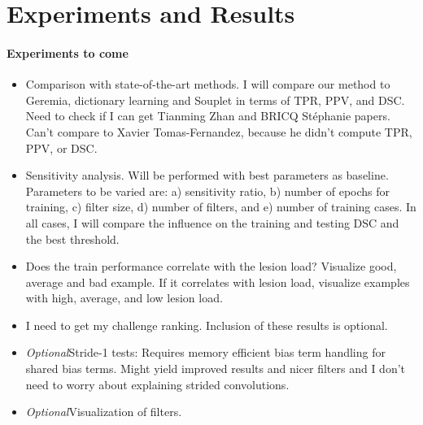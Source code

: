 %

\section{Experiments and Results}

\paragraph{Experiments to come}

\begin{itemize}
  
\item Comparison with state-of-the-art methods. I will compare our method to
Geremia, dictionary learning and Souplet in terms of TPR, PPV, and DSC. Need to
check if I can get Tianming Zhan and  BRICQ St\'ephanie papers. Can't compare to
Xavier Tomas-Fernandez, because he didn't compute TPR, PPV, or DSC.

\item Sensitivity analysis. Will be performed with best parameters as baseline.
Parameters to be varied are: a) sensitivity ratio, b) number of epochs for
training, c) filter size, d) number of filters, and e) number of training cases.
In all cases, I will compare the influence on the training and testing DSC and
the best threshold.

\item Does the train performance correlate with the lesion load? Visualize good,
average and bad example. If it correlates with lesion load, visualize examples
with high, average, and low lesion load.

\item I need to get my challenge ranking. Inclusion of these results is
optional.

\item \emph{Optional}\quad Stride-1 tests: Requires memory efficient bias term
handling for shared bias terms. Might yield improved results and nicer filters
and I don't need to worry about explaining strided convolutions.

\item \emph{Optional}\quad Visualization of filters.

\end{itemize}



